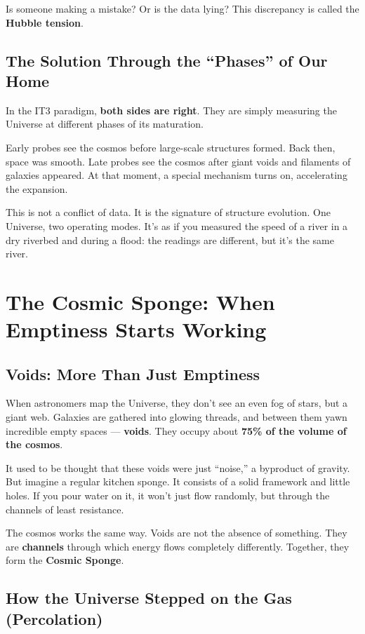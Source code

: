\documentclass[12pt,a4paper,oneside]{book}
\begin{document}
Is someone making a mistake? Or is the data lying? This discrepancy is called the \textbf{Hubble tension}.

\section{The Solution Through the “Phases” of Our Home}

In the IT3 paradigm, \textbf{both sides are right}. They are simply measuring the Universe at different phases of its maturation.

Early probes see the cosmos before large-scale structures formed. Back then, space was smooth. Late probes see the cosmos after giant voids and filaments of galaxies appeared. At that moment, a special mechanism turns on, accelerating the expansion.

This is not a conflict of data. It is the signature of structure evolution. One Universe, two operating modes. It’s as if you measured the speed of a river in a dry riverbed and during a flood: the readings are different, but it’s the same river.

\chapter{The Cosmic Sponge: When Emptiness Starts Working}

\section{Voids: More Than Just Emptiness}

When astronomers map the Universe, they don't see an even fog of stars, but a giant web. Galaxies are gathered into glowing threads, and between them yawn incredible empty spaces — \textbf{voids}. They occupy about \textbf{75\% of the volume of the cosmos}.

It used to be thought that these voids were just “noise,” a byproduct of gravity. But imagine a regular kitchen sponge. It consists of a solid framework and little holes. If you pour water on it, it won't just flow randomly, but through the channels of least resistance.

The cosmos works the same way. Voids are not the absence of something. They are \textbf{channels} through which energy flows completely differently. Together, they form the \textbf{Cosmic Sponge}.

\section{How the Universe Stepped on the Gas (Percolation)}
\end{document}
